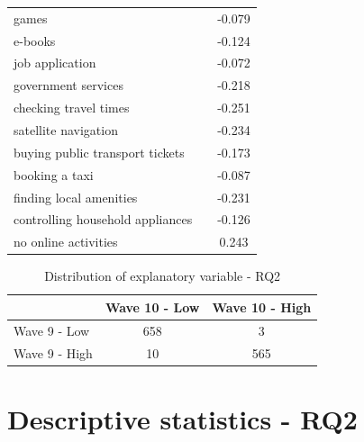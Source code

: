 \begin{table}
\begin{subtable}[t]{0.4\textwidth}
\begin{tabular}{llc}
                games &  & -0.079 \\
                e-books &  & -0.124 \\
                job application &  & -0.072 \\
                government services &  & -0.218 \\
                checking travel times &  & -0.251 \\
                satellite navigation &  & -0.234 \\
                buying public transport tickets &  & -0.173 \\
                booking a taxi &  & -0.087 \\
                finding local amenities &  & -0.231 \\
                controlling household appliances &  & -0.126 \\
                no online activities &  & 0.243 \\
                \bottomrule
            \end{tabular}
        \end{subtable}
\end{table}


\begin{table}[h!]
    \centering
    \caption{Distribution of explanatory variable - RQ2}
    \label{tab:explanatory_variable_rq2}
    \begin{tabular}{lcc}
        \toprule
         & Wave 10 - Low & Wave 10 - High \\
        \midrule
        Wave 9 - Low & 658 & 3 \\
        Wave 9 - High & 10 & 565 \\
        \bottomrule
    \end{tabular}
\end{table}


\section{Descriptive statistics - RQ2}

